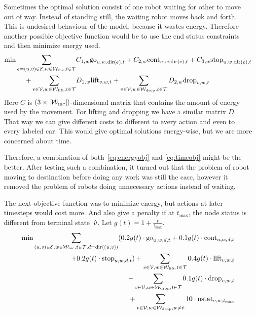 Sometimes the optimal solution consist of one robot waiting for other to move
out of way. Instead of standing still, the waiting robot moves back and forth.
This is undesired behaviour of the model, because it wastes energy. Therefore
another possible objective function would be to use the end status constraints
and then minimize energy used.
\begin{align}
    \begin{split}
        \label{eq:energyobj}
        \min \sum_{e=(u,v) \in \mathcal{E},w \in \mathcal{W}_\mathrm{mc},t \in \mathcal{T}}
        &C_{1,w} \mathrm{go}_{u,w,\mathrm{dir}(e),t} + C_{2,w} \mathrm{cont}_{u,w,\mathrm{dir}(e),t} + C_{3,w}
        \mathrm{stop}_{u,w,\mathrm{dir}(e),t}\\
        +\sum_{v \in \mathcal{V}, w \in \mathcal{W}_\mathrm{lift},t \in \mathcal{T}} &D_{1,w} \mathrm{lift}_{v,w,t}
        +\sum_{v \in \mathcal{V}, w \in \mathcal{W}_\mathrm{drop},t \in \mathcal{T}} D_{2,w} \mathrm{drop}_{v,w,t}
    \end{split}
\end{align}
Here $C$ is $(3 \times |\mathcal{W}_\mathrm{mc}|)$-dimensional matrix that contains the amount of
energy used by the movement. For lifting and dropping we have a similar matrix
$D$. That way we can give different costs to different to every action and even
to every labeled car. This would give optimal solutions energy-wise,
but we are more concerned about time.

Therefore, a combination of both~\eqref{eq:energyobj} and \eqref{eq:timeobj}
might be the better. After testing such a combination, it turned out that the
problem of robot moving to destination before doing any work was still the
case, however it removed the problem of robots doing unnecessary
actions instead of waiting.

The next objective function was to minimize energy, but actions at later
timesteps would cost more. And also give a penalty if at $t_{\max}$, the node
status is different from terminal state~$\hat{v}$. Let $g(t) = 1 +
\frac{t}{t_{\max}}$.
\begin{align}
    \begin{split}
        \label{eq:objective}
        \min \sum_{(u,v) \in \mathcal{E},w \in \mathcal{W}_\mathrm{mc},t \in \mathcal{T},d=\mathrm{dir}((u,v))}(0.2 g(t) \cdot
        \mathrm{go}_{u,w,d,t} + 0.1 g(t) \cdot \mathrm{cont}_{u,w,d,t}\\ + 0.2 g(t)
        \cdot \mathrm{stop}_{u,w,d,t})
        +\sum_{v \in \mathcal{V}, w \in \mathcal{W}_\mathrm{lift},t \in \mathcal{T}} 0.4 g(t) \cdot \mathrm{lift}_{v,w,t}\\
        +\sum_{v \in \mathcal{V}, w \in \mathcal{W}_\mathrm{drop},t \in \mathcal{T}} 0.1 g(t) \cdot \mathrm{drop}_{v,w,t}\\
        +\sum_{v \in \mathcal{V}, w \in \mathcal{W}_\mathrm{drop}, w \neq \hat{v}} 10 \cdot
        \mathrm{nstat}_{v,w,t_{\max}}
    \end{split}
\end{align}

